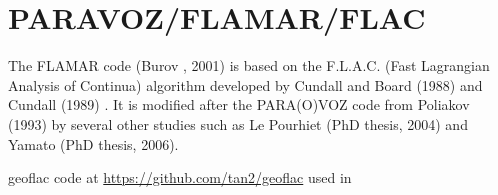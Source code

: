 \section{PARAVOZ/FLAMAR/FLAC}

The FLAMAR code (Burov \etal, 2001) is based on the
F.L.A.C. (Fast Lagrangian Analysis of Continua) algorithm developed by Cundall and Board (1988) 
and Cundall (1989) \cite{cund89}. It is modified after the PARA(O)VOZ code from 
Poliakov \etal (1993) \cite{pocp93} by several
other studies such as Le Pourhiet (PhD thesis, 2004) and Yamato (PhD thesis, 2006).

geoflac code at \url{https://github.com/tan2/geoflac} used in \cite{gojd23}

